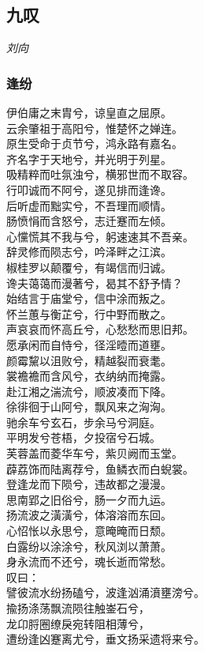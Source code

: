 \documentclass[]{article}
\begin{document}
\hypertarget{header-n316}{%
\subsection{九叹}\label{header-n316}}

\emph{刘向}

\hypertarget{header-n321}{%
\subsubsection{逢纷}\label{header-n321}}

伊伯庸之末胄兮，谅皇直之屈原。\\
云余肇祖于高阳兮，惟楚怀之婵连。\\
原生受命于贞节兮，鸿永路有嘉名。\\
齐名字于天地兮，并光明于列星。\\
吸精粹而吐氛浊兮，横邪世而不取容。\\
行叩诚而不阿兮，遂见排而逢谗。\\
后听虚而黜实兮，不吾理而顺情。\\
肠愤悁而含怒兮，志迁蹇而左倾。\\
心戃慌其不我与兮，躬速速其不吾亲。\\
辞灵修而陨志兮，吟泽畔之江滨。\\
椒桂罗以颠覆兮，有竭信而归诚。\\
谗夫蔼蔼而漫著兮，曷其不舒予情？\\
始结言于庙堂兮，信中涂而叛之。\\
怀兰蕙与衡芷兮，行中野而散之。\\
声哀哀而怀高丘兮，心愁愁而思旧邦。\\
愿承闲而自恃兮，径淫曀而道壅。\\
颜霉黧以沮败兮，精越裂而衰耄。\\
裳襜襜而含风兮，衣纳纳而掩露。\\
赴江湘之湍流兮，顺波凑而下降。\\
徐徘徊于山阿兮，飘风来之洶洶。\\
驰余车兮玄石，步余马兮洞庭。\\
平明发兮苍梧，夕投宿兮石城。\\
芙蓉盖而菱华车兮，紫贝阙而玉堂。\\
薜荔饰而陆离荐兮，鱼鳞衣而白蜺裳。\\
登逢龙而下陨兮，违故都之漫漫。\\
思南郢之旧俗兮，肠一夕而九运。\\
扬流波之潢潢兮，体溶溶而东回。\\
心怊怅以永思兮，意晻晻而日颓。\\
白露纷以涂涂兮，秋风浏以萧萧。\\
身永流而不还兮，魂长逝而常愁。\\
叹曰：\\
譬彼流水纷扬磕兮，波逢汹涌濆壅滂兮。\\
揄扬涤荡飘流陨往触崟石兮，\\
龙卬脟圈缭戾宛转阻相薄兮，\\
遭纷逢凶蹇离尤兮，垂文扬采遗将来兮。
\end{document}
